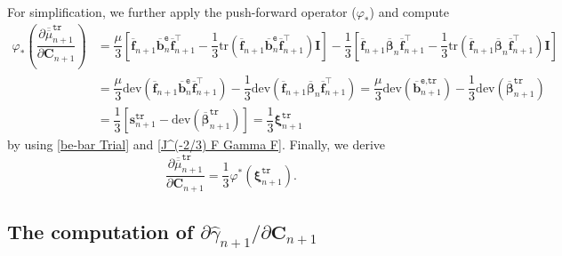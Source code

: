 \documentclass[preprint,11pt]{elsarticle}
\theoremstyle{definition}
\begin{document}
For simplification, we further apply the push-forward operator ($\varphi_*$) and compute
\begin{equation*}
    \begin{array}{ll}
        \varphi_* \left( \dfrac{\partial \overline{\overline{\mu}}_{n+1}^\texttt{tr}}{\partial \mathbf{C}_{n+1}} \right)
        &= \dfrac{\mu}{3} \left[ \overline{\mathbf{f}}_{n+1} \overline{\mathbf{b}}_n^\texttt{e} \overline{\mathbf{f}}_{n+1}^\top
        - \dfrac{1}{3} \text{tr} \left( \overline{\mathbf{f}}_{n+1} \overline{\mathbf{b}}_n^\texttt{e} \overline{\mathbf{f}}_{n+1}^\top \right) \mathbf{I} \right]
        - \dfrac{1}{3} \left[ \overline{\mathbf{f}}_{n+1} \overline{\boldsymbol{\beta}}_n \overline{\mathbf{f}}_{n+1}^\top - \dfrac{1}{3} \text{tr} \left( \overline{\mathbf{f}}_{n+1} \overline{\boldsymbol{\beta}}_n \overline{\mathbf{f}}_{n+1}^\top \right) \mathbf{I} \right] \\[12pt]
         & = \dfrac{\mu}{3} \text{dev} \left( \overline{\mathbf{f}}_{n+1} \overline{\mathbf{b}}_n^\texttt{e} \overline{\mathbf{f}}_{n+1}^\top \right)
         - \dfrac{1}{3} \text{dev} \left( \overline{\mathbf{f}}_{n+1} \overline{\boldsymbol{\beta}}_n \overline{\mathbf{f}}_{n+1}^\top \right)
         = \dfrac{\mu}{3} \text{dev} \left( \overline{\mathbf{b}}_{n+1}^\texttt{e,tr} \right)
         - \dfrac{1}{3} \text{dev} \left( \overline{\boldsymbol{\beta}}_{n+1}^\texttt{tr} \right) \\[12pt]
         & = \dfrac{1}{3} \left[ \mathbf{s}_{n+1}^\texttt{tr}
         - \text{dev} \left( \overline{\boldsymbol{\beta}}_{n+1}^\texttt{tr} \right) \right]
         = \dfrac{1}{3} \boldsymbol{\xi}_{n+1}^\texttt{tr}
    \end{array}
\end{equation*}
by using \eqref{be-bar Trial} and \eqref{J^(-2/3) F Gamma F}. Finally, we derive
\begin{equation} \label{Partial mu-bar-bar Partial C Final}
    \dfrac{\partial \overline{\overline{\mu}}_{n+1}^\texttt{tr}}{\partial \mathbf{C}_{n+1}} = \dfrac{1}{3} \varphi^* \left( \boldsymbol{\xi}_{n+1}^\texttt{tr} \right). 
\end{equation}

\subsection[]{The computation of $\partial \widehat{\gamma}_{n+1} / \partial \mathbf{C}_{n+1}$} 
\end{document}

